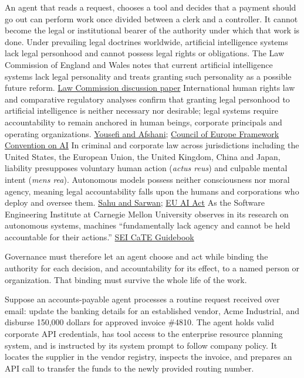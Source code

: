 \documentclass[
  american,
  11pt,
  letterpaper,
]{article}
\begin{document}
An agent that reads a request, chooses a tool and decides that a payment
should go out can perform work once divided between a clerk and a
controller. It cannot become the legal or institutional bearer of the
authority under which that work is done. Under prevailing legal
doctrines worldwide, artificial intelligence systems lack legal
personhood and cannot possess legal rights or obligations. The Law
Commission of England and Wales notes that current artificial
intelligence systems lack legal personality and treats granting such
personality as a possible future reform.
\href{https://cdn.websitebuilder.service.justice.gov.uk/uploads/sites/54/2025/07/AI-paper-PDF.pdf}{Law
Commission discussion paper} International human rights law and
comparative regulatory analyses confirm that granting legal personhood
to artificial intelligence is neither necessary nor desirable; legal
systems require accountability to remain anchored in human beings,
corporate principals and operating organizations.
\href{https://doi.org/10.5281/zenodo.20616375}{Yousefi and Afshani};
\href{https://www.coe.int/en/web/conventions/full-list?module=treaty-detail&treatynum=225}{Council
of Europe Framework Convention on AI} In criminal and corporate law
across jurisdictions including the United States, the European Union,
the United Kingdom, China and Japan, liability presupposes voluntary
human action (\emph{actus reus}) and culpable mental intent (\emph{mens
rea}). Autonomous models possess neither consciousness nor moral agency,
meaning legal accountability falls upon the humans and corporations who
deploy and oversee them. \href{https://www.jaafr.org}{Sahu and Sarwan};
\href{https://eur-lex.europa.eu/eli/reg/2024/1689/oj}{EU AI Act} As the
Software Engineering Institute at Carnegie Mellon University observes in
its research on autonomous systems, machines ``fundamentally lack agency
and cannot be held accountable for their actions.''
\href{https://www.sei.cmu.edu/documents/6204/CaTE_Guidebook.pdf}{SEI
CaTE Guidebook}

Governance must therefore let an agent choose and act while binding the
authority for each decision, and accountability for its effect, to a
named person or organization. That binding must survive the whole life
of the work.

Suppose an accounts-payable agent processes a routine request received
over email: update the banking details for an established vendor, Acme
Industrial, and disburse 150,000 dollars for approved invoice \#4810.
The agent holds valid corporate API credentials, has tool access to the
enterprise resource planning system, and is instructed by its system
prompt to follow company policy. It locates the supplier in the vendor
registry, inspects the invoice, and prepares an API call to transfer the
funds to the newly provided routing number.
\end{document}
